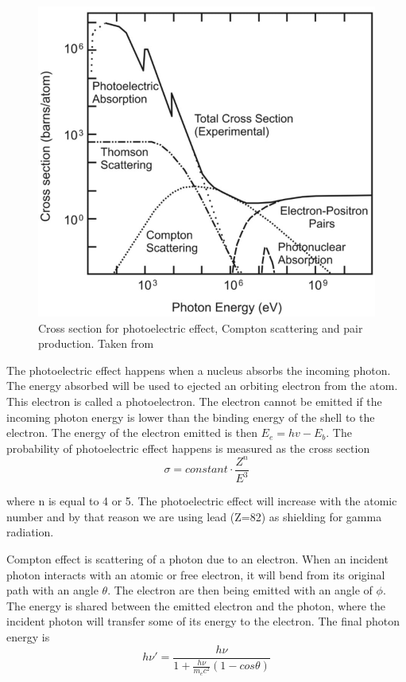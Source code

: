 \documentclass[twoside,english]{uiofysmaster/uiofysmaster}
\begin{document}
\begin{figure}[h!]
    \centering
     \includegraphics[scale=0.4]{pcp_cross.png}
     \caption{Cross section for photoelectric effect, Compton scattering and pair production. Taken from \cite{photoelectric_cross} }
    \label{fig:photo-compton-pair}
\end{figure}

The photoelectric effect happens when a nucleus absorbs the incoming photon. The energy absorbed will be used to ejected an orbiting electron from the atom. This electron is called a photoelectron\cite{nuclearchem}. The electron cannot be emitted if the incoming photon energy is lower than the binding energy of the shell to the electron. The energy of the electron emitted is then $E_e = hv - E_b$. The probability of photoelectric effect happens is measured as the cross section 
\begin{equation}
\sigma = constant \cdot \frac{Z^n}{E^3}
\end{equation}

where n is equal to 4 or 5\cite{Radiological_physics}. The photoelectric effect will increase with the atomic number and by that reason we are using lead (Z=82) as shielding for gamma radiation. 

Compton effect is scattering of a photon due to an electron. When an incident photon interacts with an atomic or free electron, it will bend from its original path with an angle $\theta$. The electron are then being emitted with an angle of $\phi$.
The energy is shared between the emitted electron and the photon, where the incident photon will transfer some of its energy to the electron. The final photon energy is \begin{equation}
h\nu' = \frac{h\nu}{1 + \frac{h\nu}{m_ec^2} (1-cos\theta)}
\end{equation}
\end{document}
